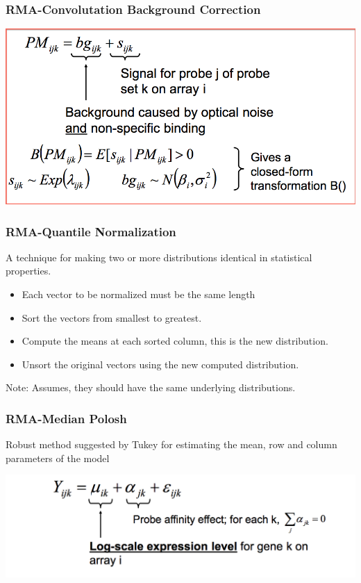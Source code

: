 \documentclass[pdf]{beamer}
\begin{document}
\begin{frame}
  \frametitle{RMA-Convolutation Background Correction}
\begin{center}
\includegraphics[scale=0.3]{figures/RMA-background.png} 
\end{center}
\end{frame}

\begin{frame}
  \frametitle{RMA-Quantile Normalization}
A technique for making two or more distributions identical in statistical properties.
\begin{itemize}
\item Each vector to be normalized must be the same length
\item Sort the vectors from smallest to greatest.
\item Compute the means at each sorted column, this is the new distribution.
\item Unsort the original vectors using the new computed distribution.
\end{itemize}
Note: Assumes, they should have the same underlying distributions.
\end{frame}

\begin{frame}
  \frametitle{RMA-Median Polosh}
Robust method suggested by Tukey for estimating the mean, row and column parameters of the model
\begin{center}
\includegraphics[scale=0.3]{figures/RMA-medianpolish.png} 
\end{center}
\end{frame}
\end{document}
